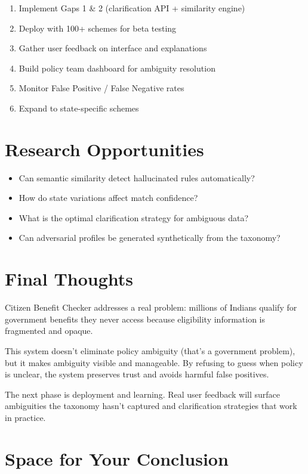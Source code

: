 \documentclass[11pt,a4paper]{report}
\begin{document}
\begin{enumerate}
  \item Implement Gaps 1 \& 2 (clarification API + similarity engine)
  \item Deploy with 100+ schemes for beta testing
  \item Gather user feedback on interface and explanations
  \item Build policy team dashboard for ambiguity resolution
  \item Monitor False Positive / False Negative rates
  \item Expand to state-specific schemes
\end{enumerate}

\section{Research Opportunities}

\begin{itemize}
  \item Can semantic similarity detect hallucinated rules automatically?
  \item How do state variations affect match confidence?
  \item What is the optimal clarification strategy for ambiguous data?
  \item Can adversarial profiles be generated synthetically from the taxonomy?
\end{itemize}

\section{Final Thoughts}

Citizen Benefit Checker addresses a real problem: millions of Indians qualify for government benefits they never access because eligibility information is fragmented and opaque.

This system doesn't eliminate policy ambiguity (that's a government problem), but it makes ambiguity visible and manageable. By refusing to guess when policy is unclear, the system preserves trust and avoids harmful false positives.

The next phase is deployment and learning. Real user feedback will surface ambiguities the taxonomy hasn't captured and clarification strategies that work in practice.

\section{Space for Your Conclusion}
\end{document}
